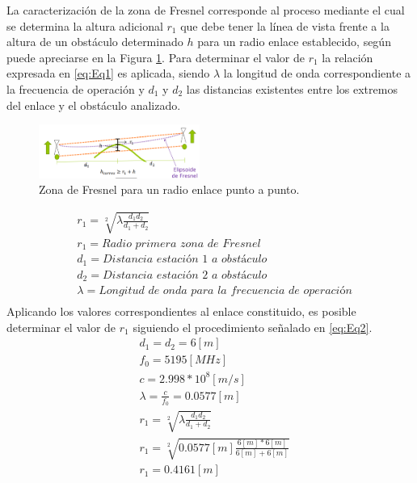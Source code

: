 \documentclass[conference]{IEEEtran}
\begin{document}
La caracterización de la zona de Fresnel corresponde al proceso mediante el cual se determina la altura adicional $r_1$ que debe tener la línea de vista
frente a la altura de un obstáculo determinado $h$ para un radio enlace establecido, según puede apreciarse en la Figura \ref{fig:Fresnel}. Para determinar el valor de $r_1$ la 
relación expresada en \ref{eq:Eq1} es aplicada, siendo $\lambda$ la longitud de onda correspondiente a la frecuencia de operación y $d_1$ y $d_2$ las distancias existentes
entre los extremos del enlace y el obstáculo analizado.
\begin{figure}
    \centering
          \includegraphics[width=0.47\textwidth]{Fresnel.png}
        \caption{Zona de Fresnel para un radio enlace punto a punto.
        }
        \label{fig:Fresnel}
\end{figure}
\begin{equation}
    \label{eq:Eq1}
    \begin{aligned}
        &r_{1} = \sqrt[2]{\lambda\frac{d_1d_2}{d_1+d_2}}\\
        &r_{1} = \textit{Radio primera zona de Fresnel}\\
        &d_{1} = \textit{Distancia estación 1 a obstáculo}\\
        &d_{2} = \textit{Distancia estación 2 a obstáculo}\\
        &\lambda = \textit{Longitud de onda para la frecuencia de operación}\\
    \end{aligned}
\end{equation}
Aplicando los valores correspondientes al enlace constituido, es posible determinar el valor de $r_1$ siguiendo el procedimiento
señalado en \ref{eq:Eq2}.
\begin{equation}
    \label{eq:Eq2}
    \begin{aligned}
        &d_1=d_2=6[m]\\
        &f_0 = 5195[MHz]\\
        &c = 2.998*10^{8}[m/s]\\
        &\lambda = \frac{c}{f_0}=0.0577[m]\\
        &r_{1} = \sqrt[2]{\lambda\frac{d_1d_2}{d_1+d_2}}\\
        &r_{1} = \sqrt[2]{0.0577[m]\frac{6[m]*6[m]}{6[m]+6[m]}}\\
        &r_{1} = 0.4161[m]\\
    \end{aligned}
\end{equation}
\end{document}
